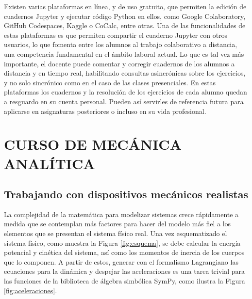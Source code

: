\documentclass[a4paper]{fodami}        %
\begin{document}
Existen varias plataformas en línea, y de uso gratuito, que permiten la edición de cuadernos Jupyter y ejecutar código Python en ellos, como Google Colaboratory, GitHub Codespaces, Kaggle o CoCalc, entre otras.
Una de las funcionalidades de estas plataformas es que permiten compartir el cuaderno Jupyter con otros usuarios, lo que fomenta entre los alumnos al trabajo colaborativo a distancia, una competencia fundamental en el ámbito laboral actual.
Lo que es tal vez más importante, el docente puede comentar y corregir cuadernos de los alumnos a distancia y en tiempo real, habilitando consultas asincrónicas sobre los ejercicios, y no solo sincrónico como en el caso de las clases presenciales.
En estas plataformas los cuadernos y la resolución de los ejercicios de cada alumno quedan a resguardo en su cuenta personal.
Pueden así servirles de referencia futura para aplicarse en asignaturas posteriores o incluso en su vida profesional.


\section{CURSO DE MECÁNICA ANALÍTICA}

\subsection{Trabajando con dispositivos mecánicos realistas}

La complejidad de la matemática para modelizar sistemas crece rápidamente a medida que se contemplan más factores para hacer del modelo más fiel a los elementos que se presentan el sistema físico real.
Una vez esquematizado el sistema físico, como muestra la Figura \ref{fig:esquema}, se debe calcular la energía potencial y cinética del sistema, así como los momentos de inercia de los cuerpos que lo componen. 
A partir de estos, generar con el formalismo Lagrangiano las ecuaciones para la dinámica y despejar las aceleraciones es una tarea trivial para las funciones de la biblioteca de álgebra simbólica SymPy, como ilustra la Figura \ref{fig:aceleraciones}.
\end{document}
